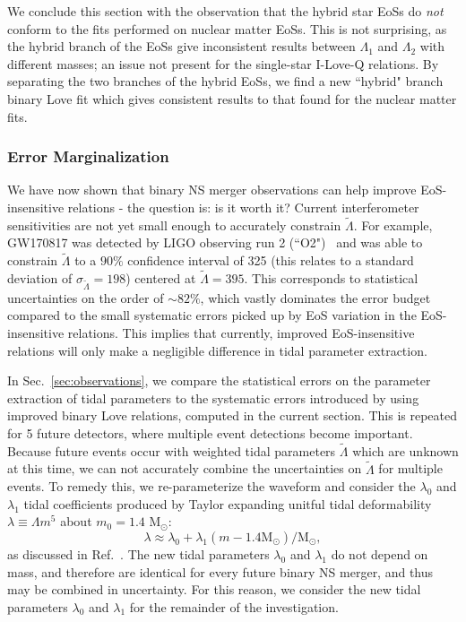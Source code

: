 \documentclass[prd,twocolumn,nofootinbib,superscriptaddress,amsmath,amssymb]{revtex4-1}
\begin{document}
We conclude this section with the observation that the hybrid star EoSs do \emph{not} conform to the fits performed on nuclear matter EoSs.
This is not surprising, as the hybrid branch of the EoSs give inconsistent results between $\Lambda_1$ and $\Lambda_2$ with different masses; an issue not present for the single-star I-Love-Q relations.
By separating the two branches of the hybrid EoSs, we find a new ``hybrid" branch binary Love fit which gives consistent results to that found for the nuclear matter fits.

\subsubsection{Error Marginalization}
We have now shown that binary NS merger observations can help improve EoS-insensitive relations - the question is: is it worth it?
Current interferometer sensitivities are not yet small enough to accurately constrain $\tilde{\Lambda}$.
For example, GW170817 was detected by LIGO observing run 2 (``O2")~\cite{aLIGO} and was able to constrain $\tilde{\Lambda}$ to a $90\%$ confidence interval of 325 (this relates to a standard deviation of $\sigma_{\tilde{\Lambda}}=198$) centered at $\tilde{\Lambda}=395$.
This corresponds to statistical uncertainties on the order of $\sim 82\%$, which vastly dominates the error budget compared to the small systematic errors picked up by EoS variation in the EoS-insensitive relations.
This implies that currently, improved EoS-insensitive relations will only make a negligible difference in tidal parameter extraction.

In Sec.~\ref{sec:observations}, we compare the statistical errors on the parameter extraction of tidal parameters to the systematic errors introduced by using improved binary Love relations, computed in the current section.
This is repeated for 5 future detectors, where multiple event detections become important.
Because future events occur with weighted tidal parameters $\tilde\Lambda$ which are unknown at this time, we can not accurately combine the uncertainties on $\tilde\Lambda$ for multiple events.
To remedy this, we re-parameterize the waveform and consider the $\lambda_0$ and $\lambda_1$ tidal coefficients produced by Taylor expanding unitful tidal deformability $\lambda \equiv \Lambda m^5$ about $m_0=1.4\text{ M}_{\odot}$:
\begin{equation}
\lambda \approx \lambda_0 + \lambda_1 (m-1.4 \text{M}_{\odot})/\text{M}_{\odot},
\end{equation}
as discussed in Ref.~\cite{delPozzo:TaylorTidal}.
The new tidal parameters $\lambda_0$ and $\lambda_1$ do not depend on mass, and therefore are identical for every future binary NS merger, and thus may be combined in uncertainty.
For this reason, we consider the new tidal parameters $\lambda_0$ and $\lambda_1$ for the remainder of the investigation.
\end{document}
